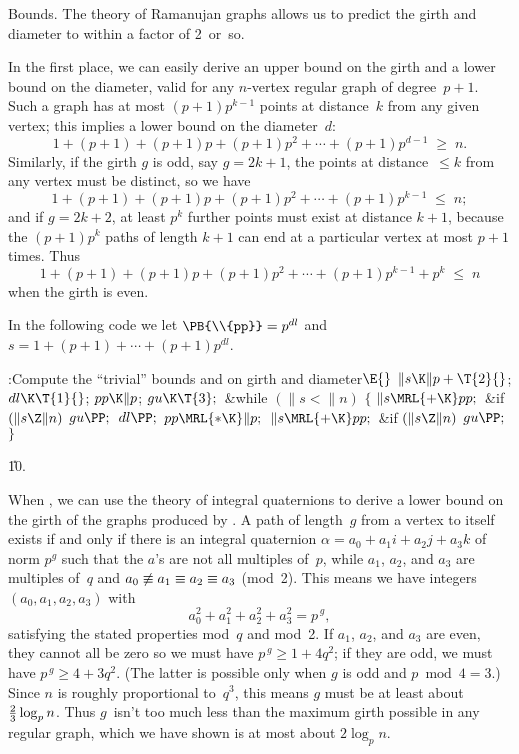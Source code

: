 Bounds. The theory of Ramanujan graphs allows us to predict the
girth and diameter to within a factor of 2~or~so.

In the first place, we can easily derive an upper bound on the girth
and a lower bound on the diameter, valid for any $n$-vertex regular graph
of degree~$p+1$. Such a graph has at most $(p+1)p^{k-1}$ points at
distance~$k$ from any given vertex; this implies a lower bound
on the diameter~$d$:
$$1+(p+1)+(p+1)p+(p+1)p^2+\cdots+(p+1)p^{d-1}\;\ge\;n.$$
Similarly, if the girth $g$ is odd, say $g=2k+1$, the points at
distance~$\le k$ from any vertex must be distinct, so we have
$$1+(p+1)+(p+1)p+(p+1)p^2+\cdots+(p+1)p^{k-1}\;\le\;n;$$
and if $g=2k+2$, at least $p^k$ further points must exist at distance
$k+1$, because the $(p+1)p^k$ paths of length $k+1$ can end at
a particular vertex at most $p+1$ times. Thus
$$1+(p+1)+(p+1)p+(p+1)p^2+\cdots+(p+1)p^{k-1}+p^k\;\le\;n$$
when the girth is even.

In the following code we let $\PB{\\{pp}}=p^{dl}$ and
$s=1+(p+1)+\cdots+(p+1)p^{dl}$.

\Y\B\4:Compute the ``trivial'' bounds  and  on girth
and diameter\X${}\E{}$\6
$\|s\K\|p+\T{2}{}$;\5
${}\\{dl}\K\T{1}{}$;\5
${}\\{pp}\K\|p{}$;\5
${}\\{gu}\K\T{3};{}$\6
\&{while} ${}(\|s<\|n){}$\5
${}\{{}$\1\6
${}\|s\MRL{+{\K}}\\{pp};{}$\6
\&{if} ${}(\|s\Z\|n){}$\1\5
${}\\{gu}\PP;{}$\2\6
${}\\{dl}\PP;{}$\6
${}\\{pp}\MRL{*{\K}}\|p;{}$\6
${}\|s\MRL{+{\K}}\\{pp};{}$\6
\&{if} ${}(\|s\Z\|n){}$\1\5
${}\\{gu}\PP;{}$\2\6
\4${}\}{}$\2\par
\U10.\fi

When , we can use the theory of integral quaternions to
derive a lower
bound on the girth of the graphs produced by . A path of
length~$g$
from a vertex to itself exists if and only if there is an integral
quaternion $\alpha=a_0+a_1i+a_2j+a_3k$ of norm $p^g$ such that
the $a$'s are not all multiples of~$p$, while
$a_1$, $a_2$, and $a_3$ are multiples of~$q$ and $a_0\not\=a_1\=a_2\=a_3$
(mod~2). This means we have integers $(a_0,a_1,a_2,a_3)$ with
$$a_0^2+a_1^2+a_2^2+a_3^2=p^{\,g},$$ satisfying the stated properties
mod~$q$ and mod~2.
If $a_1$, $a_2$, and $a_3$ are even, they cannot all be zero so
we must have $p^{\,g}\ge1+4q^2$; if they are odd, we must have
$p^{\,g}\ge4+3q^2$. (The latter is possible only when $g$ is odd and
$p\bmod4=3$.) Since $n$ is roughly proportional to~$q^3$, this means
$g$ must be at least about ${2\over3}\log_p n$. Thus $g$~isn't
too much less than the maximum girth possible in any regular graph,
which we have shown is at most about $2\log_p n$.

